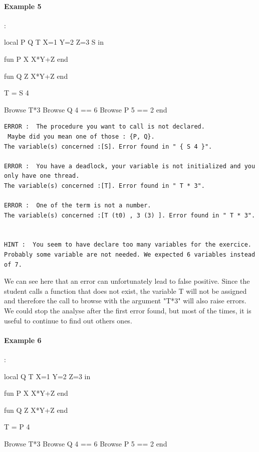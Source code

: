 \documentclass[11pt,a4paper,twoside,openright]{report}
\begin{document}
\paragraph{Example 5}:

\begin{OZ}
local P Q T X=1 Y=2 Z=3 S in
  
  fun {P X}
    X*Y+Z
end 

  fun {Q Z}
    X*Y+Z
  end
  
  T = {S 4}

  {Browse T*3}
  {Browse {Q 4} == 6}
  {Browse {P 5} == 2}
end
\end{OZ}

\begin{lstlisting}
ERROR :  The procedure you want to call is not declared.
 Maybe did you mean one of those : {P, Q}. 
The variable(s) concerned :[S]. Error found in " { S 4 }".

ERROR :  You have a deadlock, your variable is not initialized and you only have one thread. 
The variable(s) concerned :[T]. Error found in " T * 3".

ERROR :  One of the term is not a number. 
The variable(s) concerned :[T (t0) , 3 (3) ]. Error found in " T * 3".


HINT :  You seem to have declare too many variables for the exercice. 
Probably some variable are not needed. We expected 6 variables instead of 7.
\end{lstlisting}

We can see here that an error can unfortunately lead to false positive. Since 
the student calls a function that does not exist, the variable T will not be 
assigned and therefore the call to browse with the argument "T*3" will also 
raise errors. We could stop the analyse after the first error found, but most 
of 
the times, it is useful to continue to find out others ones.
\newpage
\paragraph{Example 6}:

\begin{OZ}
local Q T X=1 Y=2 Z=3 in
  
  fun {P X}
    X*Y+Z
end 

  fun {Q Z}
    X*Y+Z
  end
  
  T = {P 4}

  {Browse T*3}
  {Browse {Q 4} == 6}
  {Browse {P 5} == 2}
end
\end{OZ}
\end{document}
